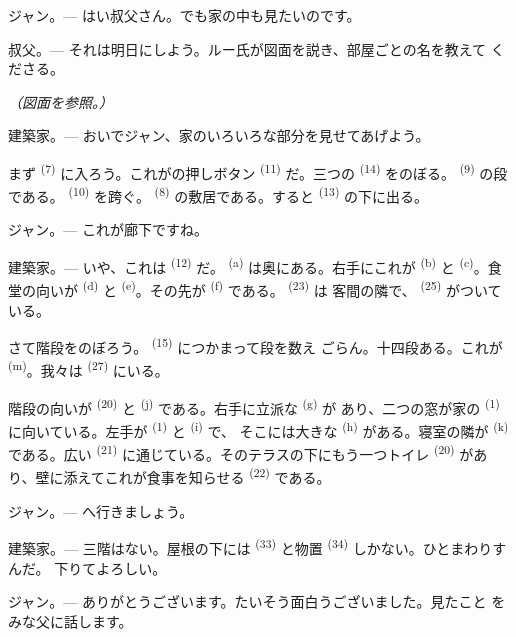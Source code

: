 \textsc{ジャン}。--- はい叔父さん。でも家の中も見たいのです。

\textsc{叔父}。--- それは明日にしよう。ルー氏が図面を説き、部屋ごとの名を教えて
くださる。

\VUsaut{3.0mm}
\VUsaut{2.4mm}

{\centering\textit{（図面を参照。）}\par}
\VUsaut{2.4mm}

\textsc{建築家}。--- おいでジャン、家のいろいろな部分を見せてあげよう。

まず \textsuperscript{(7)} に入ろう。これがの押しボタン
\textsuperscript{(11)} だ。三つの \textsuperscript{(14)} をのぼる。
 \textsuperscript{(9)} の段である。 \textsuperscript{(10)}
を跨ぐ。 \textsuperscript{(8)} の敷居である。すると
\textsuperscript{(13)} の下に出る。

\textsc{ジャン}。--- これが廊下ですね。

\textsc{建築家}。--- いや、これは \textsuperscript{(12)} だ。
 \textsuperscript{(a)} は奥にある。右手にこれが
\textsuperscript{(b)} と \textsuperscript{(c)}。食堂の向いが
 \textsuperscript{(d)} と \textsuperscript{(e)}。その先が
 \textsuperscript{(f)} である。 \textsuperscript{(23)} は
客間の隣で、 \textsuperscript{(25)} がついている。

さて階段をのぼろう。 \textsuperscript{(15)} につかまって段を数え
ごらん。十四段ある。これが \textsuperscript{(m)}。我々は
 \textsuperscript{(27)} にいる。

\VUsaut{3.0mm}
\VUsaut{3.0mm}

階段の向いが \textsuperscript{(20)} と
\textsuperscript{(j)} である。右手に立派な \textsuperscript{(g)} が
あり、二つの窓が家の \textsuperscript{(1)} に向いている。左手が
 \textsuperscript{(1)} と \textsuperscript{(i)} で、
そこには大きな \textsuperscript{(h)} がある。寝室の隣が
 \textsuperscript{(k)} である。広い
\textsuperscript{(21)} に通じている。そのテラスの下にもう一つトイレ
\textsuperscript{(20)} があり、壁に添えてこれが食事を知らせる
\textsuperscript{(22)} である。

\textsc{ジャン}。--- へ行きましょう。

\textsc{建築家}。--- 三階はない。屋根の下には
\textsuperscript{(33)} と物置 \textsuperscript{(34)} しかない。ひとまわりすんだ。
下りてよろしい。

\textsc{ジャン}。--- ありがとうございます。たいそう面白うございました。見たこと
をみな父に話します。
\VUsaut{4.0mm}
\VUfilet{22mm}
